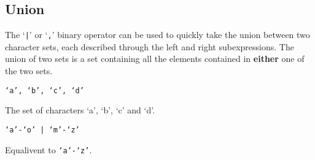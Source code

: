 
\subsection{Union}
{
	The `\texttt{|}' or `\texttt{,}' binary operator can be used to
	quickly take the union between two character sets, each described through
	the left and right subexpressions. The union of two sets is
	a set containing all the elements contained in \textbf{either} one of the
	two sets.
	
	\begin{itemize}
	{
		\item[] \texttt{`a', `b', `c', `d'}
		
			The set of characters `a', `b', `c' and `d'.
		
		\item[] \texttt{`a'-`o' | `m'-`z'}
		
			Equalivent to \texttt{`a'-`z'}.
	}
	\end{itemize}
}

